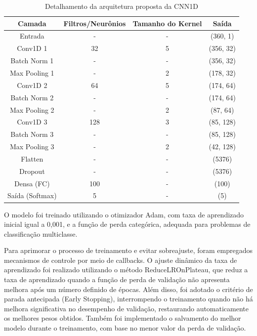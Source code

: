 \begin{table}[ht]
  \caption{Detalhamento da arquitetura proposta da CNN1D}
  \label{tab: table3}
  \centering

  \begin{tabular}{cccc}
    \hline
    \bfseries Camada & \bfseries Filtros/Neurônios & \bfseries Tamanho do Kernel & \bfseries Saída\\
    \hline
    Entrada	&	-	&	-	&	(360, 1)\\
    Conv1D 1	&	32	&	5	&	(356, 32)\\
    Batch Norm 1	&	-	&	-	&	(356, 32)\\
    Max Pooling 1	&	-	&	2	&	(178, 32)\\
    Conv1D 2	&	64	&	5	&	(174, 64)\\
    Batch Norm 2	&	-	&	-	&	(174, 64)\\
    Max Pooling 2	&	-	&	2	&	(87, 64)\\
    Conv1D 3	&	128	&	3	&	(85, 128)\\
    Batch Norm 3	&	-	&	-	&	(85, 128)\\
    Max Pooling 3	&	-	&	2	&	(42, 128)\\
    Flatten	&	-	&	-	&	(5376)\\
    Dropout	&	-	&	-	&	(5376)\\
    Densa (FC)	&	100	&	-	&	(100)\\
    Saída (Softmax)	&	5	&	-	&	(5)\\

    \hline
  \end{tabular}

  \source
\end{table}

O modelo foi treinado utilizando o otimizador Adam, com taxa de aprendizado inicial igual a 0,001, e a função de perda categórica, adequada para
problemas de classificação multiclasse.

Para aprimorar o processo de treinamento e evitar sobreajuste, foram empregados mecanismos de controle por meio de callbacks. O ajuste dinâmico
da taxa de aprendizado foi realizado utilizando o método ReduceLROnPlateau, que reduz a taxa de aprendizado quando a função de perda de 
validação não apresenta melhora após um número definido de épocas. Além disso, foi adotado o critério de parada antecipada (Early Stopping), 
interrompendo o treinamento quando não há melhora significativa no desempenho de validação, restaurando automaticamente os melhores pesos 
obtidos. Também foi implementado o salvamento do melhor modelo durante o treinamento, com base no menor valor da perda de validação.

